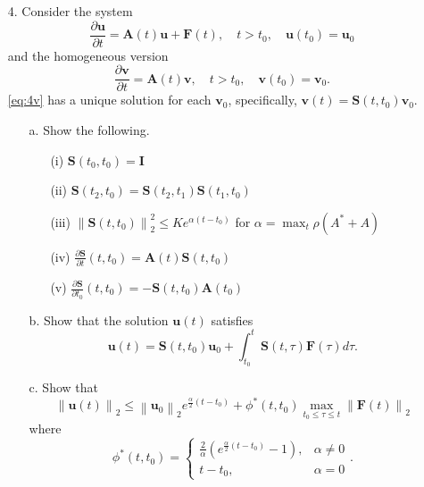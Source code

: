 \documentclass{article}
\begin{document}
\begin{itemize}
\item[4.] Consider the system
\begin{equation} \label{eq:4u}
\frac{\partial \mathbf{u}}{\partial t} = \mathbf{A}(t) \mathbf{u} + \mathbf{F}(t), \quad t > t_0, \quad \mathbf{u} \left( t_0 \right) = \mathbf{u}_0
\end{equation}
and the homogeneous version
\begin{equation} \label{eq:4v}
\frac{\partial \mathbf{v}}{\partial t} = \mathbf{A}(t) \mathbf{v}, \quad t > t_0, \quad \mathbf{v} \left( t_0 \right) = \mathbf{v}_0.
\end{equation}
\eqref{eq:4v} has a unique solution for each $\mathbf{v}_0$, specifically, $\mathbf{v}(t) = \mathbf{S} \left( t,t_0 \right) \mathbf{v}_0$.

\begin{itemize}
\item[a.] Show the following.
\begin{itemize}
\item[(i)] $\mathbf{S} \left( t_0, t_0 \right) = \mathbf{I}$
\item[(ii)] $\mathbf{S} \left( t_2, t_0 \right) = \mathbf{S} \left( t_2, t_1 \right) \mathbf{S} \left( t_1, t_0 \right)$
\item[(iii)] $\left\lVert \mathbf{S} \left( t, t_0 \right) \right\rVert_2^2 \leq K e^{\alpha \left( t - t_0 \right)}$ for $\alpha = \max_t \rho \left( A^* + A \right)$
\item[(iv)] $\frac{\partial \mathbf{S}}{\partial t} \left( t, t_0 \right) = \mathbf{A}(t) \mathbf{S} \left( t, t_0 \right)$
\item[(v)] $\frac{\partial \mathbf{S}}{\partial t_0} \left( t, t_0 \right) = -\mathbf{S} \left( t, t_0 \right) \mathbf{A} \left( t_0 \right)$
\end{itemize}
\item[b.] Show that the solution $\mathbf{u}(t)$ satisfies
\begin{equation*}
\mathbf{u}(t) = \mathbf{S} \left( t, t_0 \right) \mathbf{u}_0 + \int_{t_0}^t \mathbf{S}(t,\tau) \mathbf{F}(\tau) d\tau.
\end{equation*}
\item[c.] Show that
\begin{equation*}
\left\lVert \mathbf{u}(t) \right\rVert_2 \leq \left\lVert \mathbf{u}_0 \right\rVert_2 e^{\frac{\alpha}{2} \left( t - t_0 \right)} + \phi^* \left( t, t_0 \right) \max_{t_0 \leq \tau \leq t} \left\lVert \mathbf{F}(t) \right\rVert_2
\end{equation*}
where
\begin{equation*}
\phi^* \left( t, t_0 \right) = \begin{cases} \frac{2}{\alpha} \left( e^{\frac{\alpha}{2} \left( t - t_0 \right)} - 1 \right), & \alpha \neq 0 \\ t - t_0, & \alpha = 0 \end{cases}.
\end{equation*}
\end{itemize}


\end{itemize}
\end{document}
